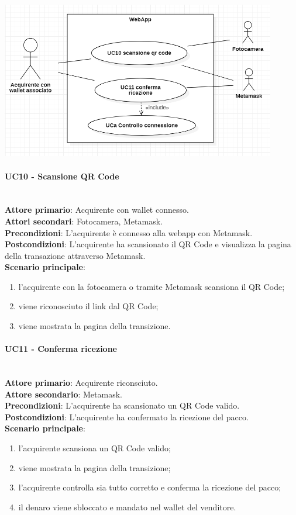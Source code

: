 \documentclass[a4paper, 12pt]{article}
\begin{document}
\includegraphics[width=0.9\textwidth]{UC_WAA1}

\paragraph{UC10 - Scansione QR Code}\\
\textbf{Attore primario}: Acquirente con wallet connesso.\\
\textbf{Attori secondari}: Fotocamera, Metamask.\\
\textbf{Precondizioni}: L'acquirente è connesso alla webapp con Metamask.\\
\textbf{Postcondizioni}: L'acquirente ha scansionato il QR Code e visualizza la pagina della transazione attraverso Metamask.\\
\textbf{Scenario principale}:
\begin{enumerate}
    \item l'acquirente con la fotocamera o tramite Metamask scansiona il QR Code;
    \item viene riconosciuto il link dal QR Code;
    \item viene mostrata la pagina della transizione.
\end{enumerate}

\paragraph{UC11 - Conferma ricezione}\\
\textbf{Attore primario}: Acquirente riconsciuto.\\
\textbf{Attore secondario}: Metamask.\\
\textbf{Precondizioni}: L'acquirente ha scansionato un QR Code valido.\\
\textbf{Postcondizioni}: L'acquirente ha confermato la ricezione del pacco.\\
\textbf{Scenario principale}:
\begin{enumerate}
    \item l'acquirente scansiona un QR Code valido;
    \item viene mostrata la pagina della transizione;
    \item l'acquirente controlla sia tutto corretto e conferma la ricezione del pacco;
    \item il denaro viene sbloccato e mandato nel wallet del venditore.
\end{enumerate}
\end{document}
